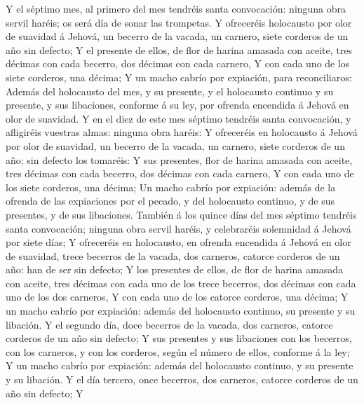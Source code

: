  Y el séptimo mes, al primero del mes tendréis santa
convocación: ninguna obra servil haréis; os será día de sonar las
trompetas.  Y ofreceréis holocausto por olor de suavidad á
Jehová, un becerro de la vacada, un carnero, siete corderos de un año
sin defecto;  Y el presente de ellos, de flor de harina
amasada con aceite, tres décimas con cada becerro, dos décimas con cada
carnero,  Y con cada uno de los siete corderos, una
décima;  Y un macho cabrío por expiación, para
reconciliaros:  Además del holocausto del mes, y su
presente, y el holocausto continuo y su presente, y sus libaciones,
conforme á su ley, por ofrenda encendida á Jehová en olor de suavidad.
 Y en el diez de este mes séptimo tendréis santa
convocación, y afligiréis vuestras almas: ninguna obra haréis:
 Y ofreceréis en holocausto á Jehová por olor de suavidad,
un becerro de la vacada, un carnero, siete corderos de un año; sin
defecto los tomaréis:  Y sus presentes, flor de harina
amasada con aceite, tres décimas con cada becerro, dos décimas con cada
carnero,  Y con cada uno de los siete corderos, una
décima;  Un macho cabrío por expiación: además de la
ofrenda de las expiaciones por el pecado, y del holocausto continuo, y
de sus presentes, y de sus libaciones.  También á los
quince días del mes séptimo tendréis santa convocación; ninguna obra
servil haréis, y celebraréis solemnidad á Jehová por siete días;
 Y ofreceréis en holocausto, en ofrenda encendida á
Jehová en olor de suavidad, trece becerros de la vacada, dos carneros,
catorce corderos de un año: han de ser sin defecto;  Y
los presentes de ellos, de flor de harina amasada con aceite, tres
décimas con cada uno de los trece becerros, dos décimas con cada uno de
los dos carneros,  Y con cada uno de los catorce
corderos, una décima;  Y un macho cabrío por expiación:
además del holocausto continuo, su presente y su libación.
 Y el segundo día, doce becerros de la vacada, dos
carneros, catorce corderos de un año sin defecto;  Y sus
presentes y sus libaciones con los becerros, con los carneros, y con los
corderos, según el número de ellos, conforme á la ley;  Y
un macho cabrío por expiación: además del holocausto continuo, y su
presente y su libación.  Y el día tercero, once becerros,
dos carneros, catorce corderos de un año sin defecto;  Y
